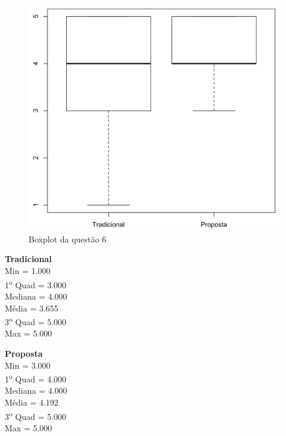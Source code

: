 \begin{figure}[htb]
  \caption{\label{fig:questao6-boxplot}Boxplot da questão 6}
  \begin{center}
      \includegraphics[scale=0.4]{./Figuras/questao6-boxplot.png}
  \end{center}
\end{figure}

\begin{multicols}{2}

\noindent\textbf{Tradicional}\\
Min = 1.000\\
1\textsuperscript{o} Quad = 3.000\\
Mediana = 4.000\\
Média = 3.655\\
3\textsuperscript{o} Quad = 5.000\\
Max = 5.000\\
\columnbreak

\noindent\textbf{Proposta}\\
Min = 3.000\\
1\textsuperscript{o} Quad = 4.000\\
Mediana = 4.000\\
Média = 4.192\\
3\textsuperscript{o} Quad = 5.000\\
Max = 5.000
\end{multicols}

